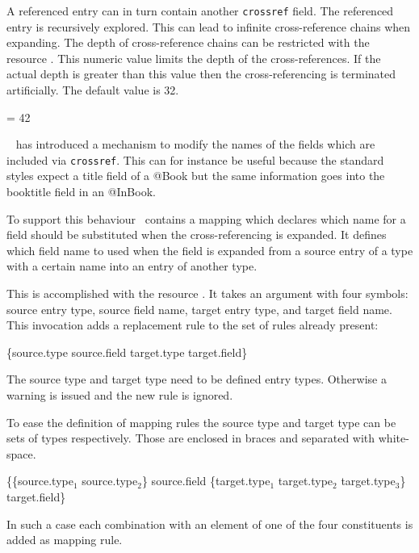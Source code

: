 \documentclass[11pt,a4paper]{scrbook}
\begin{document}
A referenced entry can in turn contain another \texttt{crossref} field. The
referenced entry is recursively explored. This can lead to infinite
cross-reference chains when expanding. The depth of cross-reference chains can
be restricted with the resource . This numeric value
limits the depth of the cross-references. If the actual depth is greater than
this value then the cross-referencing is terminated artificially. The default
value is 32.

\begin{Resources}
   = 42
\end{Resources}

\bibLaTeX\ \cite{lehmann:biblatex} has introduced a mechanism to modify the
names of the fields which are included via \texttt{crossref}. This can for
instance be useful because the standard styles expect a title field of a @Book
but the same information goes into the booktitle field in an @InBook.

To support this behaviour \BibTool\ contains a mapping which declares which
name for a field should be substituted when the cross-referencing is expanded.
It defines which field name to used when the field is expanded from a source
entry of a type with a certain name into an entry of another type.

This is accomplished with the resource . It takes an
argument with four symbols: source entry type, source field name, target
entry type, and target field name. This invocation adds a replacement rule to
the set of rules already present:

\begin{Resources}
   \{source.type source.field target.type target.field\}
\end{Resources}

The source type and target type need to be defined entry types. Otherwise a
warning is issued and the new rule is ignored.

To ease the definition of mapping rules the source type and target type can be
sets of types respectively. Those are enclosed in braces and separated with
white-space. 

\begin{Resources}
   \{\{source.type$_1$ source.type$_2$\} source.field
  \{target.type$_1$ target.type$_2$ target.type$_3$\} target.field\}
\end{Resources}

In such a case each combination with an element of one of the four
constituents is added as mapping rule.
\end{document}
